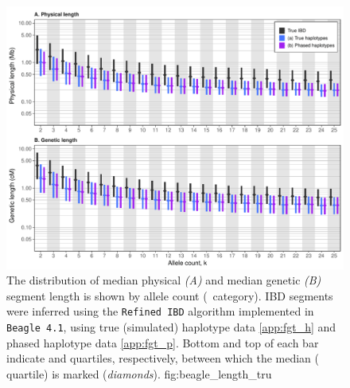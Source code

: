 

\begin{figure}[!htb]
\includegraphics[width=\textwidth]{./img/ch3/beagle_length_tru_new}
{The distribution of median physical \emph{(A)} and median genetic \emph{(B)} segment length is shown by allele count (\fk{}~category).
IBD segments were inferred using the \texttt{Refined\,IBD} algorithm implemented in \texttt{Beagle~4.1}, using true (simulated) haplotype data \ref{app:fgt_h} and phased haplotype data \ref{app:fgt_p}.
Bottom and top of each bar indicate  and  quartiles, respectively, between which the median ( quartile) is marked (\emph{diamonds}).\CorrectLabel}
{fig:beagle_length_tru}
\end{figure}
